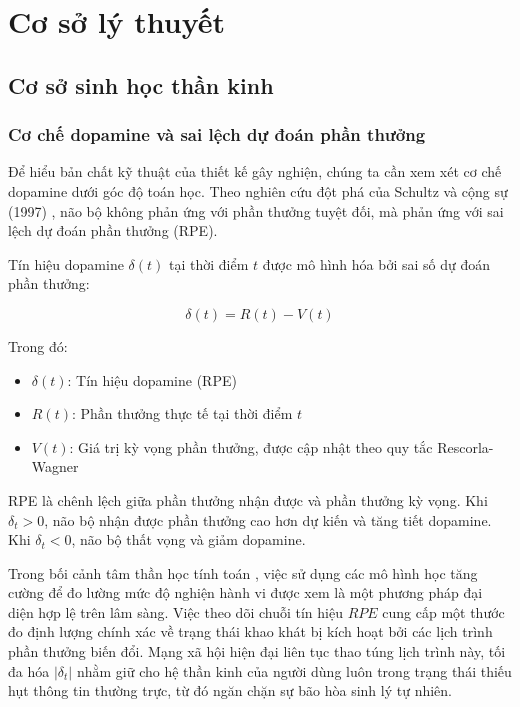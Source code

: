 \section{Cơ sở lý thuyết}

\subsection{Cơ sở sinh học thần kinh}

\subsubsection{Cơ chế dopamine và sai lệch dự đoán phần thưởng}

Để hiểu bản chất kỹ thuật của thiết kế gây nghiện, chúng ta cần xem xét cơ chế dopamine dưới góc độ toán học. Theo nghiên cứu đột phá của Schultz và cộng sự (1997) \cite{schultz1997}, não bộ không phản ứng với phần thưởng tuyệt đối, mà phản ứng với sai lệch dự đoán phần thưởng (RPE).

Tín hiệu dopamine $\delta(t)$ tại thời điểm $t$ được mô hình hóa bởi sai số dự đoán phần thưởng:

\begin{equation}
    \delta(t) = R(t) - V(t)
    \label{eq:rpe}
\end{equation}

Trong đó:
\begin{itemize}
    \item $\delta(t)$: Tín hiệu dopamine (RPE)
    \item $R(t)$: Phần thưởng thực tế tại thời điểm $t$
    \item $V(t)$: Giá trị kỳ vọng phần thưởng, được cập nhật theo quy tắc Rescorla-Wagner
\end{itemize}

\begin{definition}
RPE là chênh lệch giữa phần thưởng nhận được và phần thưởng kỳ vọng. Khi $\delta_t > 0$, não bộ nhận được phần thưởng cao hơn dự kiến và tăng tiết dopamine. Khi $\delta_t < 0$, não bộ thất vọng và giảm dopamine.
\end{definition}

Trong bối cảnh tâm thần học tính toán \cite{comp_psychiatry}, việc sử dụng các mô hình học tăng cường để đo lường mức độ nghiện hành vi được xem là một phương pháp đại diện hợp lệ trên lâm sàng. Việc theo dõi chuỗi tín hiệu $RPE$ cung cấp một thước đo định lượng chính xác về trạng thái khao khát bị kích hoạt bởi các lịch trình phần thưởng biến đổi. Mạng xã hội hiện đại liên tục thao túng lịch trình này, tối đa hóa $|\delta_t|$ nhằm giữ cho hệ thần kinh của người dùng luôn trong trạng thái thiếu hụt thông tin thường trực, từ đó ngăn chặn sự bão hòa sinh lý tự nhiên.

